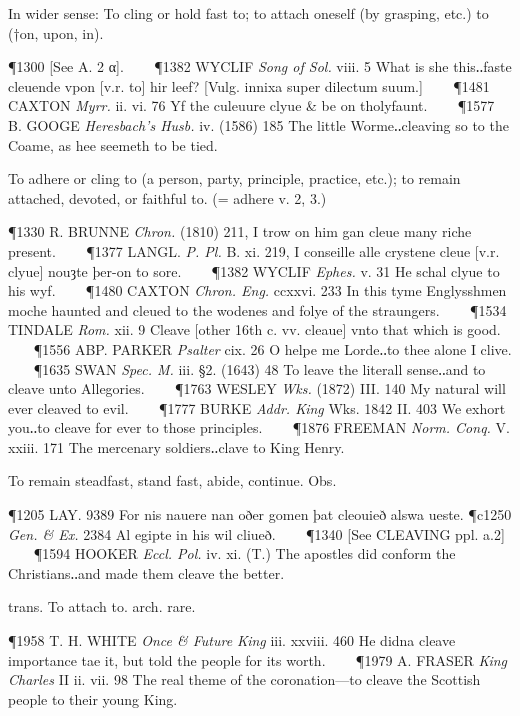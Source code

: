 \begin{description}[wide, labelwidth=!, labelindent=0pt]
\begin{myenumerate}
 In wider sense: To cling or hold fast to; to attach oneself (by grasping, etc.) to (†on, upon, in).

\P 1300 [See  A. 2 α].    
\P 1382 WYCLIF  \textit{Song of Sol.} viii. 5 What is she this‥faste cleuende vpon [v.r. to] hir leef? [Vulg. innixa super dilectum suum.]    
\P 1481 CAXTON  \textit{Myrr.} ii. vi. 76 Yf the culeuure clyue \& be on tholyfaunt.    
\P 1577 B. GOOGE  \textit{Heresbach's Husb.} iv. (1586) 185 The little Worme‥cleaving so to the Coame, as hee seemeth to be tied.

 To adhere or cling to (a person, party, principle, practice, etc.); to remain attached, devoted, or faithful to. (= adhere v. 2, 3.)

\P 1330 R. BRUNNE  \textit{Chron.} (1810) 211, I trow on him gan cleue many riche present.    
\P 1377 LANGL.  \textit{P. Pl.} B. xi. 219, I conseille alle crystene cleue [v.r. clyue] nouȝte þer-on to sore.    
\P 1382 WYCLIF  \textit{Ephes.} v. 31 He schal clyue to his wyf.    
\P 1480 CAXTON  \textit{Chron. Eng.} ccxxvi. 233 In this tyme Englysshmen moche haunted and cleued to the wodenes and folye of the straungers.    
\P 1534 TINDALE  \textit{Rom.} xii. 9 Cleave [other 16th c. vv. cleaue] vnto that which is good.    
\P 1556 ABP. PARKER  \textit{Psalter} cix. 26 O helpe me Lorde‥to thee alone I clive.    
\P 1635 SWAN  \textit{Spec. M.} iii. §2. (1643) 48 To leave the literall sense‥and to cleave unto Allegories.    
\P 1763 WESLEY  \textit{Wks.} (1872) III. 140 My natural will ever cleaved to evil.    
\P 1777 BURKE  \textit{Addr. King} Wks. 1842 II. 403  We exhort you‥to cleave for ever to those principles.    
\P 1876 FREEMAN  \textit{Norm. Conq.} V. xxiii. 171 The mercenary soldiers‥clave to King Henry.

 To remain steadfast, stand fast, abide, continue. Obs.

\P 1205 LAY.  9389 For nis nauere nan oðer gomen þat cleouieð alswa ueste.
\P c1250 \textit{Gen. \& Ex.}  2384 Al egipte in his wil cliueð.    
\P 1340 [See  CLEAVING ppl. a.2]    
\P 1594 HOOKER  \textit{Eccl. Pol.} iv. xi. (T.) The apostles did conform the Christians‥and made them cleave the better.

 trans. To attach to. arch. rare.

\P 1958 T. H. WHITE  \textit{Once \& Future King} iii. xxviii. 460 He didna cleave importance tae it, but told the people for its worth.    
\P 1979 A. FRASER  \textit{King Charles} II ii. vii. 98 The real theme of the coronation—to cleave the Scottish people to their young King.
\end{myenumerate}



\end{description}
